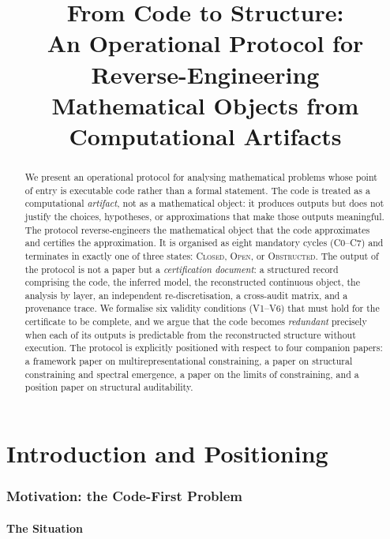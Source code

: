 \documentclass[11pt,a4paper]{article}
\title{%
  \textbf{From Code to Structure:}\\[4pt]
  \large An Operational Protocol for Reverse-Engineering\\
  Mathematical Objects from Computational Artifacts
}
\author{}
\date{}
\theoremstyle{definition}
\theoremstyle{plain}
\begin{document}
\maketitle

\begin{abstract}
\noindent
We present an operational protocol for analysing mathematical
problems whose point of entry is executable code rather than a
formal statement. The code is treated as a computational
\emph{artifact}, not as a mathematical object: it produces outputs
but does not justify the choices, hypotheses, or approximations
that make those outputs meaningful. The protocol reverse-engineers
the mathematical object that the code approximates and certifies
the approximation. It is organised as eight mandatory cycles
(C0--C7) and terminates in exactly one of three states:
\textsc{Closed}, \textsc{Open}, or \textsc{Obstructed}. The output
of the protocol is not a paper but a \emph{certification
document}: a structured record comprising the code, the inferred
model, the reconstructed continuous object, the analysis by layer,
an independent re-discretisation, a cross-audit matrix, and a
provenance trace. We formalise six validity conditions (V1--V6)
that must hold for the certificate to be complete, and we argue
that the code becomes \emph{redundant} precisely when each of its
outputs is predictable from the reconstructed structure without
execution. The protocol is explicitly positioned with respect to
four companion papers: a framework paper on multirepresentational
constraining, a paper on structural constraining and spectral
emergence, a paper on the limits of constraining, and a position
paper on structural auditability.
\end{abstract}

\tableofcontents

\part{Introduction and Positioning}

\section{Motivation: the Code-First Problem}
\label{sec:motivation}

\subsection{The Situation}
\end{document}
